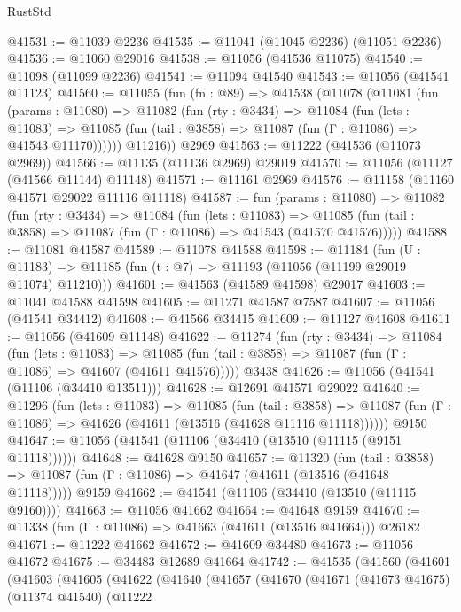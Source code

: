 \begin{lexlean}{RustStd}
\begin{coremodule}
@41531 := @11039 @2236
@41535 := @11041 (@11045 @2236) (@11051 @2236)
@41536 := @11060 @29016
@41538 := @11056 (@41536 @11075)
@41540 := @11098 (@11099 @2236)
@41541 := @11094 @41540
@41543 := @11056 (@41541 @11123)
@41560 := @11055
    (fun (fn : @89) =>
    @41538
      (@11078
        (@11081
          (fun (params : @11080) =>
          @11082
            (fun (rty : @3434) =>
            @11084
              (fun (lets : @11083) =>
              @11085 (fun (tail : @3858) => @11087 (fun (Γ : @11086) => @41543 @11170))))))
        @11216))
    @2969
@41563 := @11222 (@41536 (@11073 @2969))
@41566 := @11135 (@11136 @2969) @29019
@41570 := @11056 (@11127 (@41566 @11144) @11148)
@41571 := @11161 @2969
@41576 := @11158 (@11160 @41571 @29022 @11116 @11118)
@41587 := fun (params : @11080) =>
  @11082
    (fun (rty : @3434) =>
    @11084
      (fun (lets : @11083) =>
      @11085 (fun (tail : @3858) => @11087 (fun (Γ : @11086) => @41543 (@41570 @41576)))))
@41588 := @11081 @41587
@41589 := @11078 @41588
@41598 := @11184
    (fun (U : @11183) => @11185 (fun (t : @7) => @11193 (@11056 (@11199 @29019 @11074) @11210)))
@41601 := @41563 (@41589 @41598) @29017
@41603 := @11041 @41588 @41598
@41605 := @11271 @41587 @7587
@41607 := @11056 (@41541 @34412)
@41608 := @41566 @34415
@41609 := @11127 @41608
@41611 := @11056 (@41609 @11148)
@41622 := @11274
    (fun (rty : @3434) =>
    @11084
      (fun (lets : @11083) =>
      @11085 (fun (tail : @3858) => @11087 (fun (Γ : @11086) => @41607 (@41611 @41576)))))
    @3438
@41626 := @11056 (@41541 (@11106 (@34410 @13511)))
@41628 := @12691 @41571 @29022
@41640 := @11296
    (fun (lets : @11083) =>
    @11085
      (fun (tail : @3858) =>
      @11087 (fun (Γ : @11086) => @41626 (@41611 (@13516 (@41628 @11116 @11118))))))
    @9150
@41647 := @11056 (@41541 (@11106 (@34410 (@13510 (@11115 (@9151 @11118))))))
@41648 := @41628 @9150
@41657 := @11320
    (fun (tail : @3858) => @11087 (fun (Γ : @11086) => @41647 (@41611 (@13516 (@41648 @11118)))))
    @9159
@41662 := @41541 (@11106 (@34410 (@13510 (@11115 @9160))))
@41663 := @11056 @41662
@41664 := @41648 @9159
@41670 := @11338 (fun (Γ : @11086) => @41663 (@41611 (@13516 @41664))) @26182
@41671 := @11222 @41662
@41672 := @41609 @34480
@41673 := @11056 @41672
@41675 := @34483 @12689 @41664
@41742 := @41535
    (@41560
      (@41601
        (@41603
          (@41605
            (@41622
              (@41640
                (@41657
                  (@41670
                    (@41671
                      (@41673 @41675)
                      (@11374 @41540)
                      (@11222

\end{coremodule}
\end{lexlean}
